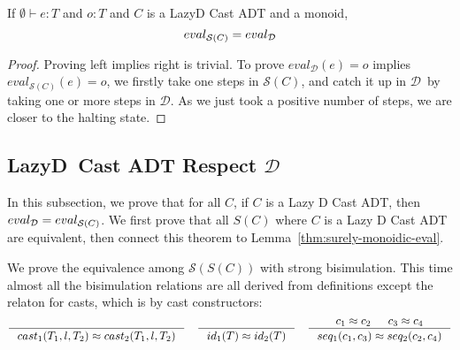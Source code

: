 \documentclass[acmsmall,review,anonymous]{acmart}\settopmatter{printfolios=true,printccs=false,printacmref=false}
\newcommand{\judgetype}[3]{#1 \vdash #2 : #3}
\newcommand{\lazyD}{Lazy\;D}
\newcommand{\judgeSeval}[3]{eval_{\mathcal{S}(#1)}(#2) = #3}
\newcommand{\ineffCEKD}{$ \mathcal{D} $}
\newcommand{\judgeDeval}[2]{eval_{\mathcal{D}}(#1) = #2}
\newcommand{\effCEK}[1]{$ \mathcal{S}(#1) $}
\newcommand{\evalEqv}[2]{$ eval_{\text{#1}} = eval_{\text{#2}} $}
\begin{document}
\begin{lemma}
	\label{thm:surely-monoidic-eval}
	If $ \judgetype{\emptyset}{e}{T} $ and $ o : T $ and $ C $ is a 
	\lazyD{} Cast ADT and a monoid,
	\[
	\text{\evalEqv{\effCEK{C}}{\ineffCEKD}}
	\]
\end{lemma}
\begin{proof}Proving left implies right is trivial.
To prove $ \judgeDeval{e}{o} $ implies $ \judgeSeval{C}{e}{o} $, 
we firstly take one steps in \effCEK{C}, and catch it up in \ineffCEKD\ by 
taking one or more steps in \ineffCEKD. As we just took a positive number of 
steps, we are closer to the halting state.
\end{proof}

\subsection{\lazyD\ Cast ADT Respect \ineffCEKD}
\label{secc:framework:all-correct}

In this subsection, we prove that for all $ C $, if $ C $ is a Lazy D Cast ADT, 
then \evalEqv{\ineffCEKD}{\effCEK{C}}. We first 
prove that all $ S(C) $ where $ C $ is a Lazy D Cast ADT are equivalent, then 
connect this theorem to Lemma~\ref{thm:surely-monoidic-eval}.

We prove the equivalence among \effCEK{S(C)} with strong bisimulation. This 
time almost all the bisimulation relations are all derived from definitions 
except the relaton for casts, which is by cast constructors:
\begin{gather*}
\inference{
}{
	cast_1(T_1,l,T_2) \approx cast_2(T_1,l,T_2)
}
\quad
\inference{
}{
	id_1(T) \approx id_2(T)
}
\quad
\inference{
	c_1 \approx c_2 &
	c_3 \approx c_4
}{
	seq_1(c_1,c_3) \approx seq_2(c_2,c_4)
}
\end{gather*}
\end{document}
